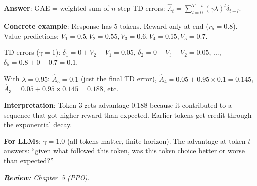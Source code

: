 \begin{questionbox}
\textbf{Answer}: GAE = weighted sum of $n$-step TD errors: $\hat{A}_t = \sum_{l=0}^{T-t} (\gamma\lambda)^l \delta_{t+l}$.

\textbf{Concrete example}: Response has 5 tokens. Reward only at end ($r_5 = 0.8$). Value predictions: $V_1=0.5, V_2=0.55, V_3=0.6, V_4=0.65, V_5=0.7$.

TD errors ($\gamma=1$): $\delta_1 = 0 + V_2 - V_1 = 0.05$, $\delta_2 = 0 + V_3 - V_2 = 0.05$, ..., $\delta_5 = 0.8 + 0 - 0.7 = 0.1$.

With $\lambda = 0.95$: $\hat{A}_5 = 0.1$ (just the final TD error), $\hat{A}_4 = 0.05 + 0.95 \times 0.1 = 0.145$, $\hat{A}_3 = 0.05 + 0.95 \times 0.145 = 0.188$, etc.

\textbf{Interpretation}: Token 3 gets advantage 0.188 because it contributed to a sequence that got higher reward than expected. Earlier tokens get credit through the exponential decay.

\textbf{For LLMs}: $\gamma=1.0$ (all tokens matter, finite horizon). The advantage at token $t$ answers: ``given what followed this token, was this token choice better or worse than expected?''

\emph{\textbf{Review:} Chapter~5 (PPO).}
\end{questionbox}

